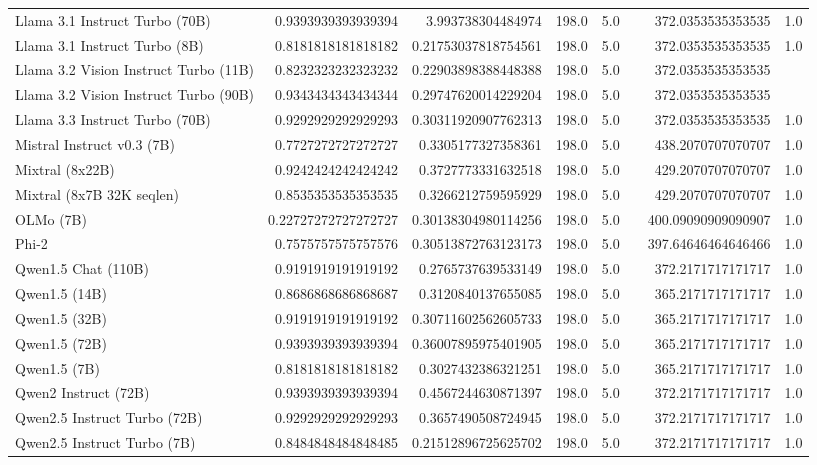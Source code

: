 \begin{table}[htp]
{\begin{tabular}{lrrrrrrr}
Llama 3.1 Instruct Turbo (70B) & 0.9393939393939394 & 3.993738304484974 & 198.0 & 5.0 &  & 372.0353535353535 & 1.0 \\
Llama 3.1 Instruct Turbo (8B) & 0.8181818181818182 & 0.21753037818754561 & 198.0 & 5.0 &  & 372.0353535353535 & 1.0 \\
Llama 3.2 Vision Instruct Turbo (11B) & 0.8232323232323232 & 0.22903898388448388 & 198.0 & 5.0 &  & 372.0353535353535 &  \\
Llama 3.2 Vision Instruct Turbo (90B) & 0.9343434343434344 & 0.29747620014229204 & 198.0 & 5.0 &  & 372.0353535353535 &  \\
Llama 3.3 Instruct Turbo (70B) & 0.9292929292929293 & 0.30311920907762313 & 198.0 & 5.0 &  & 372.0353535353535 & 1.0 \\
Mistral Instruct v0.3 (7B) & 0.7727272727272727 & 0.3305177327358361 & 198.0 & 5.0 &  & 438.2070707070707 & 1.0 \\
Mixtral (8x22B) & 0.9242424242424242 & 0.3727773331632518 & 198.0 & 5.0 &  & 429.2070707070707 & 1.0 \\
Mixtral (8x7B 32K seqlen) & 0.8535353535353535 & 0.3266212759595929 & 198.0 & 5.0 &  & 429.2070707070707 & 1.0 \\
OLMo (7B) & 0.22727272727272727 & 0.30138304980114256 & 198.0 & 5.0 &  & 400.09090909090907 & 1.0 \\
Phi-2 & 0.7575757575757576 & 0.30513872763123173 & 198.0 & 5.0 &  & 397.64646464646466 & 1.0 \\
Qwen1.5 Chat (110B) & 0.9191919191919192 & 0.2765737639533149 & 198.0 & 5.0 &  & 372.2171717171717 & 1.0 \\
Qwen1.5 (14B) & 0.8686868686868687 & 0.3120840137655085 & 198.0 & 5.0 &  & 365.2171717171717 & 1.0 \\
Qwen1.5 (32B) & 0.9191919191919192 & 0.30711602562605733 & 198.0 & 5.0 &  & 365.2171717171717 & 1.0 \\
Qwen1.5 (72B) & 0.9393939393939394 & 0.36007895975401905 & 198.0 & 5.0 &  & 365.2171717171717 & 1.0 \\
Qwen1.5 (7B) & 0.8181818181818182 & 0.3027432386321251 & 198.0 & 5.0 &  & 365.2171717171717 & 1.0 \\
Qwen2 Instruct (72B) & 0.9393939393939394 & 0.4567244630871397 & 198.0 & 5.0 &  & 372.2171717171717 & 1.0 \\
Qwen2.5 Instruct Turbo (72B) & 0.9292929292929293 & 0.3657490508724945 & 198.0 & 5.0 &  & 372.2171717171717 & 1.0 \\
Qwen2.5 Instruct Turbo (7B) & 0.8484848484848485 & 0.21512896725625702 & 198.0 & 5.0 &  & 372.2171717171717 & 1.0 \\

\end{tabular}}
\end{table}
